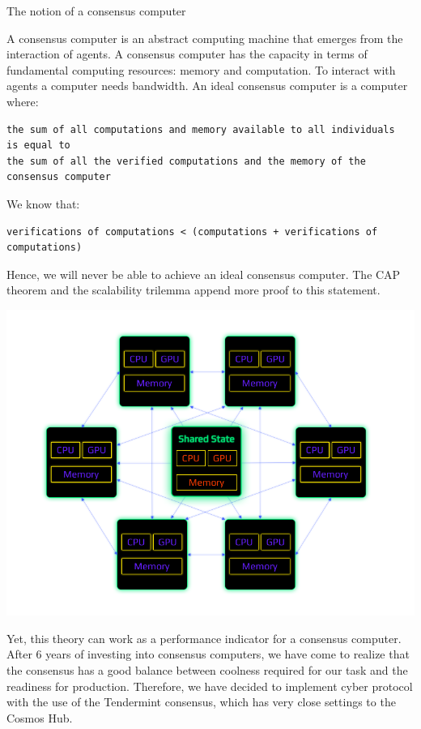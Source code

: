\documentclass[8pt,oneside]{amsart}
\makeatletter
\newcommand{\linkgreen}[2]{\href{#1}{\color{green}{#2}}}
\renewcommand\subsection{\@startsection{subsection}
                                    {2}{\z@}
                                    {-3.25ex\@plus -1ex \@minus -.2ex}
                                    {0ex \@plus .2ex}
                                    {\play\Large}
                        }
\newcommand{\titleSection}[1]{\subsection{#1}}
\newenvironment{Figure}
  {\par\medskip\noindent\minipage{\linewidth}}
  {\endminipage\par\medskip}
\makeatother
\begin{document}
\titleSection{The notion of a consensus computer}\label{consensus-computer}

A consensus computer is an abstract computing machine that emerges from the interaction of agents. A consensus computer has the capacity in terms of fundamental computing resources: memory and computation. To interact with agents a computer needs bandwidth. An ideal consensus computer is a computer where:
\\
\begin{lstlisting}
the sum of all computations and memory available to all individuals
is equal to
the sum of all the verified computations and the memory of the consensus computer
\end{lstlisting}

We know that:

\begin{lstlisting}
verifications of computations < (computations + verifications of computations)
\end{lstlisting}

Hence, we will never be able to achieve an ideal consensus computer. The CAP theorem and the scalability trilemma append more proof to this statement.

\begin{Figure}
    \centering
    \includegraphics[width=1\textwidth]{consensus-computer.png}
\end{Figure}

Yet, this theory can work as a performance indicator for a consensus computer. After 6 years of investing into consensus computers, we have come to realize that the \linkgreen{https://ipfs.io/ipfs/QmaMtD7xDgghqgjN62zWZ5TBGFiEjGQtuZBjJ9sMh816KJ}{Tendermint} consensus has a good balance between coolness required for our task and the readiness for production. Therefore, we have decided to implement cyber protocol with the use of the Tendermint consensus, which has very close settings to the Cosmos Hub.
\end{document}
